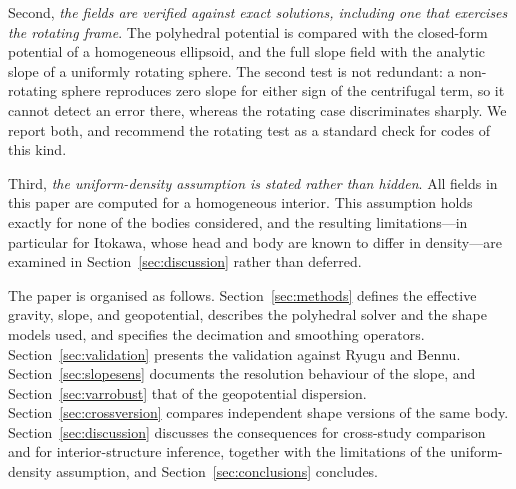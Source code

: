 Second, \emph{the fields are verified against exact solutions, including one
that exercises the rotating frame}. The polyhedral potential is compared with
the closed-form potential of a homogeneous ellipsoid, and the full slope field
with the analytic slope of a uniformly rotating sphere. The second test is not
redundant: a non-rotating sphere reproduces zero slope for either sign of the
centrifugal term, so it cannot detect an error there, whereas the rotating case
discriminates sharply. We report both, and recommend the rotating test as a
standard check for codes of this kind.

Third, \emph{the uniform-density assumption is stated rather than hidden}. All
fields in this paper are computed for a homogeneous interior. This assumption
holds exactly for none of the bodies considered, and the resulting
limitations---in particular for Itokawa, whose head and body are known to
differ in density---are examined in Section~\ref{sec:discussion} rather than
deferred.

The paper is organised as follows. Section~\ref{sec:methods} defines the
effective gravity, slope, and geopotential, describes the polyhedral solver and
the shape models used, and specifies the decimation and smoothing operators.
Section~\ref{sec:validation} presents the validation against Ryugu and Bennu.
Section~\ref{sec:slopesens} documents the resolution behaviour of the slope,
and Section~\ref{sec:varrobust} that of the geopotential dispersion.
Section~\ref{sec:crossversion} compares independent shape versions of the same
body. Section~\ref{sec:discussion} discusses the consequences for cross-study
comparison and for interior-structure inference, together with the limitations
of the uniform-density assumption, and Section~\ref{sec:conclusions} concludes.
